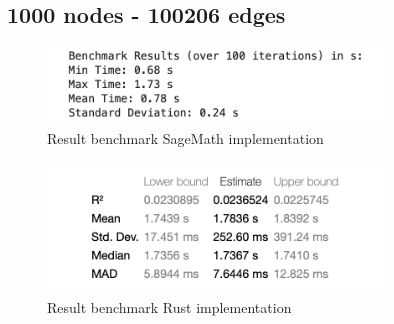 \newpage


\subsection{1000 nodes - 100206 edges}\label{subsec:result-for-graphs-1000-100206}

\begin{figure}[!h]
    \centering
    \includegraphics[width=0.80\textwidth]{images/benchmark/graph_1000_100206/benchmark_graph_1000_100206_sagemath}
    \caption{Result benchmark SageMath implementation}
    \label{fig:benchmark-graph-1000-100206-sagemath}
\end{figure}


\begin{figure}[!h]
    \centering
    \includegraphics[width=0.80\textwidth]{images/benchmark/graph_1000_100206/benchmark_graph_1000_100206_rust}
    \caption{Result benchmark Rust implementation}
    \label{fig:benchmark-graph-1000-100206-rust}
\end{figure}

